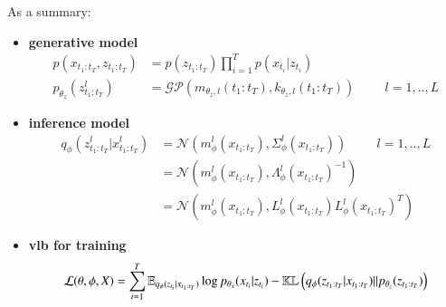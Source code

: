 As a summary:
\begin{tcolorbox}[colback=blue!5!white,colframe=black!75!black,title=Gaussian Process VAEs]
\begin{itemize}
    \item \textbf{generative model}
    \begin{align}
        \label{gen_model_gpvae}
        p(x_{t_1:t_T}, z_{t_1:t_T}) &= p(z_{t_1:t_T}) \prod_{i=1}^T p(x_{t_i} \vert z_{t_{i}}) \\
        p_{\theta_z}(z_{t_1:t_T}^l) &= \mathcal{GP}(m_{\theta_z, l}(t_1:t_T), k_{\theta_z, l}(t_1:t_T)) \hspace{1cm} l=1,..,L
    \end{align}
    \item \textbf{inference model}
    \begin{align}
        \label{inf_model_gpvae}
        q_\phi(z_{t_1:t_T}^l \vert x_{t_1:t_T}^l) &= \mathcal{N}(m_{\phi}^l(x_{t_1:t_T}), \Sigma_{\phi}^l(x_{t_1:t_T})) \hspace{1cm} l=1,..,L \\
        &= \mathcal{N}(m_{\phi}^l(x_{t_1:t_T}), \Lambda_{\phi}^l(x_{t_1:t_T})^{-1}) \\
        &= \mathcal{N}(m_{\phi}^l(x_{t_1:t_T}), L_{\phi}^l(x_{t_1:t_T})L_{\phi}^l(x_{t_1:t_T})^T)
    \end{align}
    \item \textbf{\gls{vlb} for training}
    \begin{align}
        \label{vlb_gpvae}
        \mathcal{L}(\theta, \phi, X) = \sum_{i=1}^T \mathbb{E}_{q_{\phi}(z_{t_i} \vert x_{t_1:t_T})} \log{p_{\theta_x}(x_{t_i} \vert z_{t_i})} - \mathbb{KL}\left( q_{\phi}(z_{t_1:t_T} \vert x_{t_1:t_T}) \vert\vert p_{\theta_z}(z_{t_1:t_T}) \right) 
    \end{align}
\end{itemize}
\end{tcolorbox}

